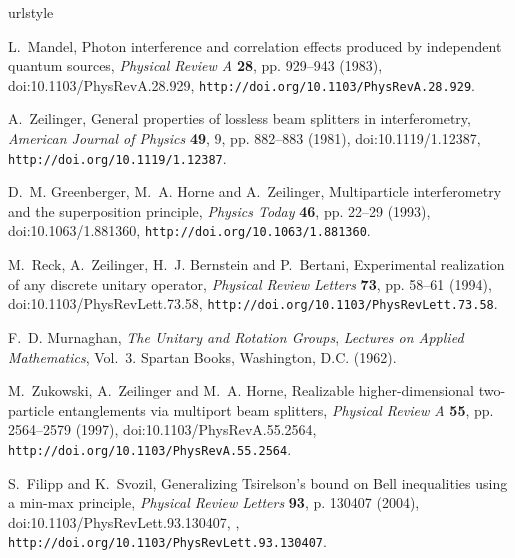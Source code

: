 \documentclass{ws-book9x6}
\begin{document}
\begin{thebibliography}{24}
\newcommand{\enquote}[1]{#1}
\providecommand{\natexlab}[1]{#1}
\providecommand{\url}[1]{\texttt{#1}}
\providecommand{\urlprefix}{URL }
\providecommand{\eprint}{eprint }
\expandafter\ifx\csname urlstyle\endcsname\relax
  \providecommand{\doi}[1]{doi:\discretionary{}{}{}#1}\else
  \providecommand{\doi}{doi:\discretionary{}{}{}\begingroup
  \urlstyle{rm}\Url}\fi

L.~Mandel, \enquote{Photon interference and correlation effects produced by
  independent quantum sources,} \emph{Physical Review A} \textbf{28}, pp.
  929--943 (1983), \doi{10.1103/PhysRevA.28.929},
  \url{http://doi.org/10.1103/PhysRevA.28.929}.

A.~Zeilinger, \enquote{General properties of lossless beam splitters in
  interferometry,} \emph{American Journal of Physics} \textbf{49}, 9, pp.
  882--883 (1981), \doi{10.1119/1.12387}, \url{http://doi.org/10.1119/1.12387}.

D.~M. Greenberger, M.~A. Horne and A.~Zeilinger, \enquote{Multiparticle
  interferometry and the superposition principle,} \emph{Physics Today}
  \textbf{46}, pp. 22--29 (1993), \doi{10.1063/1.881360},
  \url{http://doi.org/10.1063/1.881360}.

M.~Reck, A.~Zeilinger, H.~J. Bernstein and P.~Bertani, \enquote{Experimental
  realization of any discrete unitary operator,} \emph{Physical Review Letters}
  \textbf{73}, pp. 58--61 (1994), \doi{10.1103/PhysRevLett.73.58},
  \url{http://doi.org/10.1103/PhysRevLett.73.58}.

F.~D. Murnaghan, \emph{The Unitary and Rotation Groups}, \emph{Lectures on
  Applied Mathematics}, Vol.~3.
\newblock Spartan Books, Washington, D.C. (1962).

M.~Zukowski, A.~Zeilinger and M.~A. Horne, \enquote{Realizable
  higher-dimensional two-particle entanglements via multiport beam splitters,}
  \emph{Physical Review A} \textbf{55}, pp. 2564--2579 (1997),
  \doi{10.1103/PhysRevA.55.2564},
  \url{http://doi.org/10.1103/PhysRevA.55.2564}.

S.~Filipp and K.~Svozil, \enquote{Generalizing {T}sirelson's bound on {B}ell
  inequalities using a min-max principle,} \emph{Physical Review Letters}
  \textbf{93}, p. 130407 (2004), \doi{10.1103/PhysRevLett.93.130407},
  \href{http://arxiv.org/abs/arXiv:quant-ph/0403175}{},
  \url{http://doi.org/10.1103/PhysRevLett.93.130407}.


\end{thebibliography}
\end{document}
